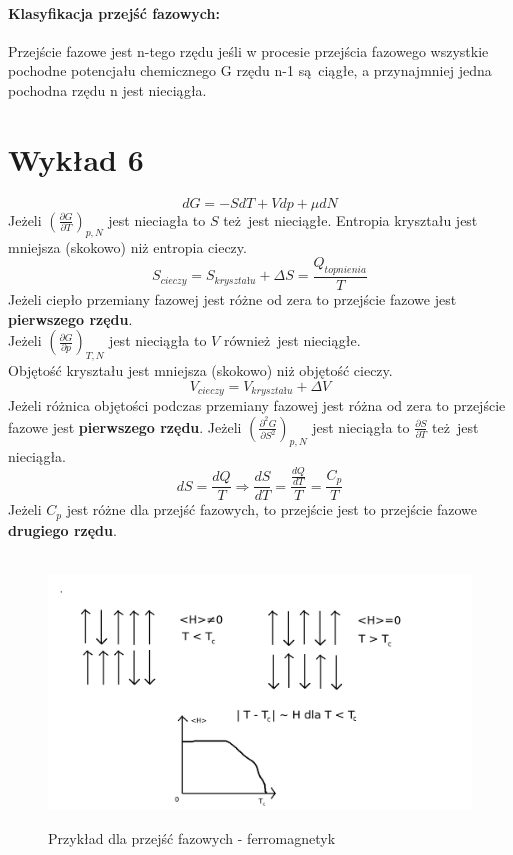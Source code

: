 \documentclass{article}
\begin{document}
		\paragraph{Klasyfikacja przejść fazowych:}
		Przejście fazowe jest n-tego rzędu jeśli w procesie przejścia fazowego wszystkie pochodne potencjału chemicznego G rzędu n-1 są ciągłe, a przynajmniej jedna pochodna rzędu n jest nieciągła.
	\section{Wykład 6} 
		\begin{equation}
			dG = -SdT + Vdp + \mu dN
		\end{equation}
		Jeżeli $ (\frac{\partial G}{\partial T})_{p,N}$ jest nieciagła to $ S $ też jest nieciągłe. Entropia kryształu jest mniejsza (skokowo) niż entropia cieczy.
		\begin{equation}
		S_{cieczy} = S_{kryształu} + \Delta S = \frac{Q_{topnienia}}{T}
		\end{equation}
		Jeżeli ciepło przemiany fazowej jest różne od zera to przejście fazowe jest \textbf{pierwszego rzędu}. \\
		Jeżeli $ (\frac{\partial G}{\partial p})_{T,N} $ jest nieciągła to $ V $ również jest nieciągłe.\\
		Objętość kryształu jest mniejsza (skokowo) niż objętość cieczy.
		\begin{equation}
		V_{cieczy} = V_{kryształu} + \Delta V
		\end{equation}
		Jeżeli różnica objętości podczas przemiany fazowej jest różna od zera to przejście fazowe jest \textbf{pierwszego rzędu}.
		Jeżeli $ (\frac{\partial ^ 2 G}{\partial S ^ 2})_{p,N} $ jest nieciągła to $ \frac{\partial S}{\partial T} $ też jest nieciągła.
		\begin{equation}
		dS = \frac{dQ}{T} \Rightarrow \frac{dS}{dT} = \frac{\frac{dQ}{dT}}{T} = \frac{C_p}{T}
		\end{equation}
		Jeżeli $ C_p $ jest różne dla przejść fazowych, to przejście jest to przejście fazowe \textbf{drugiego rzędu}.
		\begin{figure}[ht]
			\label{fig:fig1}
			\centering
			\
			\includegraphics[scale=0.45]{przejsciafazowe.jpeg}
			\caption{Przykład dla przejść fazowych - ferromagnetyk}
		\end{figure}
\end{document}
